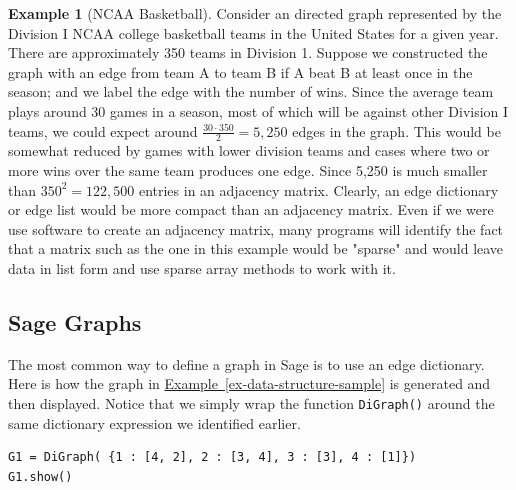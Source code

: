 \documentclass[10pt,]{book}
\theoremstyle{plain}
\theoremstyle{definition}
\theoremstyle{definition}
\theoremstyle{definition}
\newtheorem{example}[theorem]{Example}
\theoremstyle{definition}
\theoremstyle{definition}
\numberwithin{equation}{section}
\begin{document}
\begin{example}[NCAA Basketball]\label{ex-ncaa-bb}
Consider an directed graph represented by the Division I NCAA college basketball teams in the United States for a given year. There are approximately 350 teams in Division 1. Suppose we constructed the graph with an edge from team A to team B if A beat B at least once in the season; and we label the edge with the number of wins.  Since the average team plays around 30 games in a season, most of which will be against other Division I teams, we could expect around \(\frac{30 \cdot 350}{2}=5,250\) edges in the graph. This would be somewhat reduced by games with lower division teams and cases where two or more wins over the same team produces one edge. Since 5,250 is much smaller than \(350^2=122,500\) entries in an adjacency matrix.  Clearly, an edge dictionary or edge list would be more compact than an adjacency matrix.  Even if we were use software to create an adjacency matrix, many programs will identify the fact that a matrix such as the one in this example would be "sparse" and would leave data in list form and use sparse array methods to work with it.%
\end{example}
\typeout{************************************************}
\typeout{************************************************}
\subsection[Sage Graphs]{Sage Graphs}\label{sss-sage-graphs}
The most common way to define a graph in Sage is to use an edge dictionary.  Here is how the graph in \hyperref[ex-data-structure-sample]{Example~\ref{ex-data-structure-sample}} is generated and then displayed.  Notice that  we simply wrap the function \lstinline?DiGraph()? around the same dictionary expression we identified earlier.%
\begin{lstlisting}[style=sageinput]
G1 = DiGraph( {1 : [4, 2], 2 : [3, 4], 3 : [3], 4 : [1]})
G1.show()
\end{lstlisting}
\par
\end{document}
